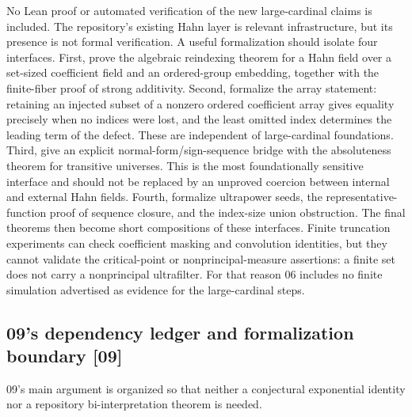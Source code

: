 \documentclass[11pt,letterpaper]{article}
\numberwithin{equation}{section}
\theoremstyle{definition}
\theoremstyle{remark}
\newcommand{\src}[1]{\textup{\textsf{\small[#1]}}}%
\begin{document}
No Lean proof or automated verification of the new large-cardinal claims is
included. The repository's existing Hahn layer is relevant infrastructure,
but its presence is not formal verification. A useful formalization should
isolate four interfaces. First, prove the algebraic reindexing theorem for a
Hahn field over a set-sized coefficient field and an ordered-group
embedding, together with the finite-fiber proof of strong additivity.
Second, formalize the array statement: retaining an injected subset of a
nonzero ordered coefficient array gives equality precisely when no indices
were lost, and the least omitted index determines the leading term of the
defect. These are independent of large-cardinal foundations. Third, give an
explicit normal-form/sign-sequence bridge with the absoluteness theorem for
transitive universes. This is the most foundationally sensitive interface
and should not be replaced by an unproved coercion between internal and
external Hahn fields. Fourth, formalize ultrapower seeds, the
representative-function proof of sequence closure, and the index-size union
obstruction. The final theorems then become short compositions of these
interfaces. Finite truncation experiments can check coefficient masking and
convolution identities, but they cannot validate the critical-point or
nonprincipal-measure assertions: a finite set does not carry a nonprincipal
ultrafilter. For that reason 06 includes no finite simulation advertised as
evidence for the large-cardinal steps.

\subsection{09's dependency ledger and formalization boundary \src{09}}
09's main argument is organized so that neither a conjectural exponential
identity nor a repository bi-interpretation theorem is needed.
\end{document}
